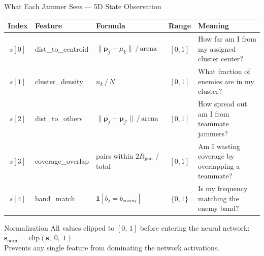 \documentclass[10pt, aspectratio=169]{beamer}
\begin{document}
\begin{frame}{What Each Jammer Sees --- 5D State Observation}
\vspace{-0.1cm}
\begin{center}
\footnotesize
\renewcommand{\arraystretch}{1.35}
\setlength{\tabcolsep}{3pt}
\begin{tabular}{|c|l|l|c|p{4.8cm}|}
\hline
\rowcolor{MARLBlue!15}
\textbf{Index} & \textbf{Feature} & \textbf{Formula} & \textbf{Range} & \textbf{Meaning} \\
\hline
$s[0]$ & dist\_to\_centroid  & $\|\mathbf{p}_j - \mu_k\| \,/\, \text{arena}$ & $[0,1]$ & How far am I from my assigned cluster center? \\
\hline
$s[1]$ & cluster\_density    & $n_k \,/\, N$                                   & $[0,1]$ & What fraction of enemies are in my cluster? \\
\hline
$s[2]$ & dist\_to\_others    & $\overline{\|\mathbf{p}_j - \mathbf{p}_{j'}\|} \,/\, \text{arena}$ & $[0,1]$ & How spread out am I from teammate jammers? \\
\hline
$s[3]$ & coverage\_overlap   & pairs within $2 R_{\text{jam}}$ / total          & $[0,1]$ & Am I wasting coverage by overlapping a teammate? \\
\hline
$s[4]$ & band\_match         & $\mathbf{1}[b_j = b_{\text{enemy}}]$            & $\{0,1\}$ & Is my frequency matching the enemy band? \\
\hline
\end{tabular}
\end{center}

\vspace{0.3cm}
\begin{exampleblock}{Normalization}
  \centering\small
  All values clipped to $[0,\,1]$ before entering the neural network:\quad
  $\mathbf{s}_{\text{norm}} = \mathrm{clip}(\mathbf{s},\;0,\;1)$\\[3pt]
  Prevents any single feature from dominating the network activations.
\end{exampleblock}
\end{frame}
\end{document}
